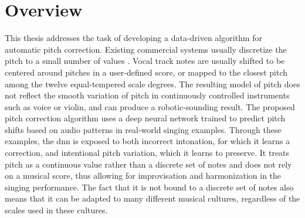 \section{Overview}
This thesis addresses the task of developing a data-driven algorithm for automatic pitch correction. Existing commercial systems usually discretize the pitch to a small number of values \cite{antares:2018}. Vocal track notes are usually shifted to be centered around pitches in a user-defined score, or mapped to the closest pitch among the twelve equal-tempered scale degrees. The resulting model of pitch does not reflect the smooth variation of pitch in continuously controlled instruments such as voice or violin, and can produce a robotic-sounding result. The proposed pitch correction algorithm uses a deep neural network trained to predict pitch shifts based on audio patterns in real-world singing examples. Through these examples, the \gls{dnn} is exposed to both incorrect intonation, for which it learns a correction, and intentional pitch variation, which it learns to preserve. It treats pitch as a continuous value rather than a discrete set of notes and does not rely on a musical score, thus allowing for improvisation and harmonization in the singing performance. The fact that it is not bound to a discrete set of notes also means that it can be adapted to many different musical cultures, regardless of the scales used in these cultures. 


